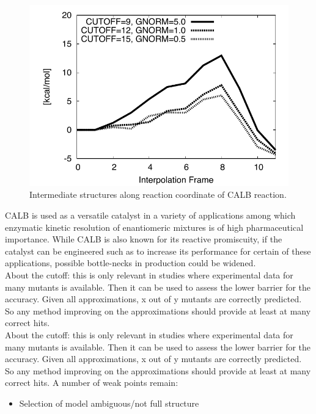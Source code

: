 {\begin{figure}[htbp]
\begin{minipage}{0.43\linewidth}
\end{minipage}
\begin{minipage}{0.55\linewidth}
\includegraphics[width=1.00\linewidth]{calb-conv.pdf}
\end{minipage}
\caption{
Intermediate structures along reaction coordinate of CALB reaction.
}
\label{fig:calb_reaction}
\end{figure}
CALB is used as a versatile catalyst in a variety of applications among which enzymatic kinetic resolution of enantiomeric mixtures is of high pharmaceutical importance\cite{gotor2006candida}.
While CALB is also known for its reactive promiscuity\cite{CBIC:CBIC200800318}, if the catalyst can be engineered such as to increase its performance for certain of these applications, possible bottle-necks in production could be widened.\\
About the cutoff: this is only relevant in studies where experimental data for many mutants is available.
Then it can be used to assess the lower barrier for the accuracy.
Given all approximations, x out of y mutants are correctly predicted.
So any method improving on the approximations should provide at least at many correct hits.\\
About the cutoff: this is only relevant in studies where experimental data for many mutants is available.
Then it can be used to assess the lower barrier for the accuracy.
Given all approximations, x out of y mutants are correctly predicted.
So any method improving on the approximations should provide at least at many correct hits.
A number of weak points remain:
\begin{itemize}
\item Selection of model ambiguous/not full structure

\end{itemize}}
